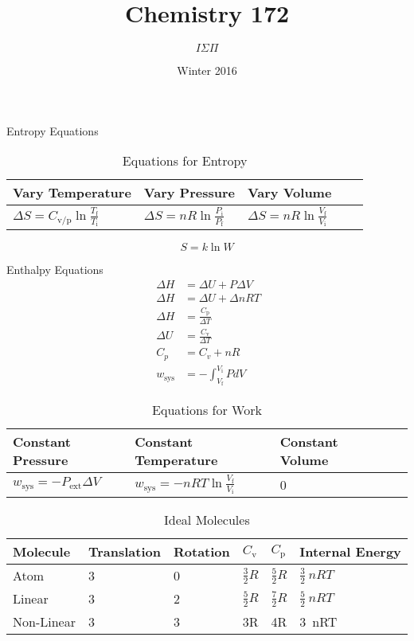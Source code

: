 \documentclass{article}
\title{Chemistry 172}
\author{$I \Sigma \Pi$}
\date{Winter 2016}
\begin{document}
\maketitle

Entropy Equations

\begin{table}[h]
\centering
\caption{Equations for Entropy}
\label{my-label}
\def\arraystretch{1.5}
\begin{tabular}{|l|l|l|l|l|}
\hline
Vary Temperature & Vary Pressure   & Vary Volume   \\
\hline
$\Delta S = C_\text{v/p}\ln{\frac{T_\text{f}}{T_\text{i}}}$   & $\Delta S = nR\ln{\frac{P_\text{i}}{P_\text{f}}}$ & $\Delta S = nR\ln{\frac{V_\text{f}}{V_\text{i}}}$ \\
\hline
\end{tabular}
\end{table}

\begin{equation*}
S = k\ln{W}
\end{equation*}



Enthalpy Equations\\
\begin{equation*}
\begin{split}
\
\Delta H &= \Delta U + P \Delta V \\ 
\
\Delta H &= \Delta U + \Delta n RT\\
\
\Delta H &= \frac{C_\text{p}}{\Delta T}\\
\
\Delta U &= \frac{C_\text{v}}{\Delta T}\\
\
C_p &= C_v + nR\\
\
w_\text{sys} & = - \int_{V_\text{f}}^{V_\text{i}} P dV
\end{split}
\end{equation*}

\begin{table}[h]
\centering
\caption{Equations for Work}
\label{my-label}
\def\arraystretch{1.5}
\begin{tabular}{|l|l|l|l|l|}
\hline
Constant Pressure & Constant Temperature & Constant Volume   \\
\hline
$w_\text{sys} = - P_{\text{ext}} \Delta V$   & $w_\text{sys} = - n R T\ln{\frac{V_\text{f}}{V_\text{i}}}$ & 0 \\
\hline
\end{tabular}
\end{table}

\begin{table}[h]
\centering
\caption{Ideal Molecules}
\label{my-label}
\def\arraystretch{1.5}
\begin{tabular}{|l|l|l|l|l|l|}
\hline
Molecule & Translation & Rotation & $C_\text{v}$ & $C_\text{p}$ & Internal Energy  \\
\hline
Atom & 3 & 0 & $\frac{3}{2}R$ & $\frac{5}{2}R$ & $\frac{3}{2}\ nRT$\\
\hline
Linear & 3 & 2 & $\frac{5}{2}R$& $\frac{7}{2}R$ & $\frac{5}{2}\ nRT$\\
\hline
Non-Linear & 3 & 3 & 3R & 4R & 3\ nRT\\
\hline
\end{tabular}
\end{table}
\end{document}
